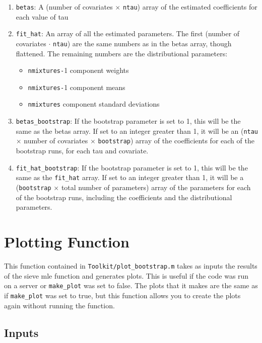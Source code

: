 \documentclass[12pt]{article}
\begin{document}
\begin{enumerate}
    \item \lstinline{betas}: A (number of covariates $\times$ \lstinline{ntau}) array of the estimated coefficients for each value of tau
    \item \lstinline{fit_hat}: An array of all the estimated parameters. The first (number of covariates $\cdot$ \lstinline{ntau}) are the same numbers as in the betas array, though flattened. The remaining numbers are the distributional parameters:
    \begin{itemize}
        \item \lstinline{nmixtures-}1 component weights
        \item \lstinline{nmixtures-}1 component means
        \item \lstinline{nmixtures} component standard deviations
    \end{itemize}
    \item \lstinline{betas_bootstrap}: If the bootstrap parameter is set to 1, this will be the same as the betas array. If set to an integer greater than 1, it will be an (\lstinline{ntau} $\times$ number of covariates $\times$ \lstinline{bootstrap}) array of the coefficients for each of the bootstrap runs, for each tau and covariate.
    \item \lstinline{fit_hat_bootstrap}: If the bootstrap parameter is set to 1, this will be the same as the \lstinline{fit_hat} array. If set to an integer greater than 1, it will be a (\lstinline{bootstrap} $\times$ total number of parameters) array of the parameters for each of the bootstrap runs, including the coefficients and the distributional parameters.
\end{enumerate}

\section{Plotting Function}

This function contained in \lstinline{Toolkit/plot_bootstrap.m} takes as inputs the results of the sieve mle function and generates plots. This is useful if the code was run on a server or \lstinline{make_plot} was set to false. The plots that it makes are the same as if \lstinline{make_plot} was set to true, but this function allows you to create the plots again without running the function.

\subsection{Inputs}
\end{document}
